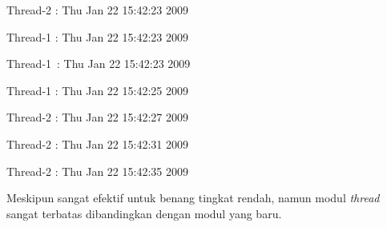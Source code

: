 \documentclass{wileySix}
\begin{document}
\noindent 
\begin{center}{\fontsize{10pt}{10pt}\selectfont Thread-2 : Thu Jan 22 15:42:23 2009}\end{center} \par
\noindent 
\begin{center}{\fontsize{10pt}{10pt}\selectfont Thread-1 : Thu Jan 22 15:42:23 2009}\end{center} \par
\noindent 
\begin{center}{\fontsize{10pt}{10pt}\selectfont Thread-1~:  Thu Jan 22 15:42:23 2009}\end{center} \par
\noindent 
\begin{center}{\fontsize{10pt}{10pt}\selectfont Thread-1 : Thu Jan 22 15:42:25 2009}\end{center} \par
\noindent 
\begin{center}{\fontsize{10pt}{10pt}\selectfont Thread-2 : Thu Jan 22 15:42:27 2009}\end{center} \par
\noindent 
\begin{center}{\fontsize{10pt}{10pt}\selectfont Thread-2 : Thu Jan 22 15:42:31 2009}\end{center} \par
\noindent 
\begin{center}{\fontsize{10pt}{10pt}\selectfont Thread-2 : Thu Jan 22 15:42:35 2009}\end{center} \par
\vspace{12pt}
Meskipun sangat efektif untuk benang tingkat rendah, namun modul \textit{thread} sangat terbatas dibandingkan dengan modul yang baru. \par
\vspace{12pt}
\end{document}
